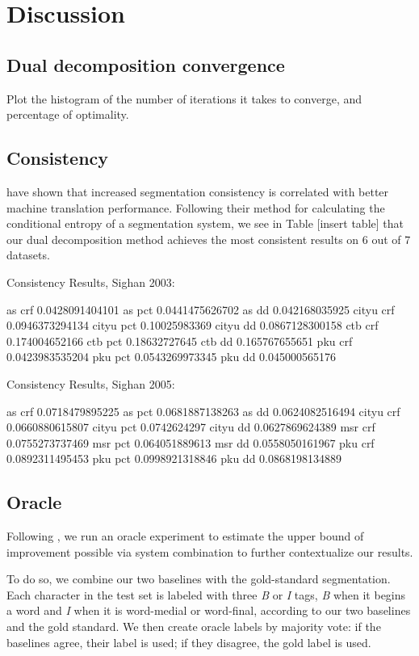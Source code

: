 \section{Discussion}


\subsection{Dual decomposition convergence}
Plot the histogram of the number of iterations it takes to converge, and percentage of optimality. 

\subsection{Consistency}

\cite{Chang:2008:ACL} have shown that increased segmentation consistency is correlated with better machine translation performance. Following their method for calculating the conditional entropy of a segmentation system, we see in Table [insert table] that our dual decomposition method achieves the most consistent results on 6 out of 7 datasets.

Consistency Results, Sighan 2003: 

as crf
0.0428091404101
as pct
0.0441475626702
as dd
0.042168035925
cityu crf
0.0946373294134
cityu pct
0.10025983369
cityu dd
0.0867128300158
ctb crf
0.174004652166
ctb pct
0.18632727645
ctb dd
0.165767655651
pku crf
0.0423983535204
pku pct
0.0543269973345
pku dd
0.045000565176


Consistency Results, Sighan 2005:

as crf
0.0718479895225
as pct
0.0681887138263
as dd
0.0624082516494
cityu crf
0.0660880615807
cityu pct
0.0742624297
cityu dd
0.0627869624389
msr crf
0.0755273737469
msr pct
0.064051889613
msr dd
0.0558050161967
pku crf
0.0892311495453
pku pct
0.0998921318846
pku dd
0.0868198134889


\subsection{Oracle}

Following \cite{Sun:2010:COLING}, we run an oracle experiment to estimate the upper bound of improvement possible via system combination to further contextualize our results. 

To do so, we combine our two baselines with the gold-standard segmentation. Each character in the test set is labeled with three \emph{B} or \emph{I} tags, \emph{B} when it begins a word and \emph{I} when it is word-medial or word-final, according to our two baselines and the gold standard. We then create oracle labels by majority vote: if the baselines agree, their label is used; if they disagree, the gold label is used.

